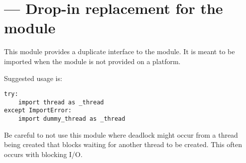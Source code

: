 \section{ ---
         Drop-in replacement for the  module}


This module provides a duplicate interface to the 
module.  It is meant to be imported when the  module
is not provided on a platform.

Suggested usage is:

\begin{verbatim}
try:
    import thread as _thread
except ImportError:
    import dummy_thread as _thread
\end{verbatim}

Be careful to not use this module where deadlock might occur from a thread 
being created that blocks waiting for another thread to be created.  This 
often occurs with blocking I/O.
